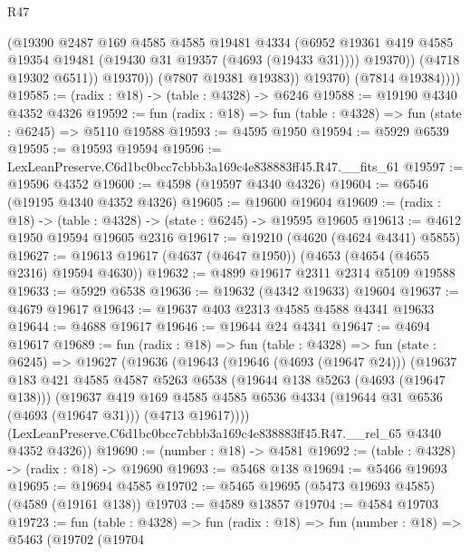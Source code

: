 \begin{lexlean}{R47}
\begin{coremodule}
                      (@19390
                        @2487
                        @169
                        @4585
                        @4585
                        @19481
                        @4334
                        (@6952
                          @19361
                          @419
                          @4585
                          @19354
                          @19481
                          (@19430 @31 @19357 (@4693 (@19433 @31))))
                        @19370))
                    (@4718 @19302 @6511))
                  @19370))
              (@7807 @19381 @19383))
            @19370)
          (@7814 @19384))))
@19585 := (radix : @18) -> (table : @4328) -> @6246
@19588 := @19190 @4340 @4352 @4326
@19592 := fun (radix : @18) => fun (table : @4328) => fun (state : @6245) => @5110 @19588
@19593 := @4595 @1950
@19594 := @5929 @6539
@19595 := @19593 @19594
@19596 := LexLeanPreserve.C6d1bc0bcc7cbbb3a169c4e838883ff45.R47.__fits_61
@19597 := @19596 @4352
@19600 := @4598 (@19597 @4340 @4326)
@19604 := @6546 (@19195 @4340 @4352 @4326)
@19605 := @19600 @19604
@19609 := (radix : @18) -> (table : @4328) -> (state : @6245) -> @19595 @19605
@19613 := @4612 @1950 @19594 @19605 @2316
@19617 := @19210 (@4620 (@4624 @4341) @5855)
@19627 := @19613 @19617 (@4637 (@4647 @1950)) (@4653 (@4654 (@4655 @2316) @19594 @4630))
@19632 := @4899 @19617 @2311 @2314 @5109 @19588
@19633 := @5929 @6538
@19636 := @19632 (@4342 @19633) @19604
@19637 := @4679 @19617
@19643 := @19637 @403 @2313 @4585 @4588 @4341 @19633
@19644 := @4688 @19617
@19646 := @19644 @24 @4341
@19647 := @4694 @19617
@19689 := fun (radix : @18) =>
  fun (table : @4328) =>
  fun (state : @6245) =>
  @19627
    (@19636
      (@19643
        (@19646 (@4693 (@19647 @24)))
        (@19637
          @183
          @421
          @4585
          @4587
          @5263
          @6538
          (@19644 @138 @5263 (@4693 (@19647 @138)))
          (@19637
            @419
            @169
            @4585
            @4585
            @6536
            @4334
            (@19644 @31 @6536 (@4693 (@19647 @31)))
            (@4713 @19617))))
      (LexLeanPreserve.C6d1bc0bcc7cbbb3a169c4e838883ff45.R47.__rel_65 @4340 @4352 @4326))
@19690 := (number : @18) -> @4581
@19692 := (table : @4328) -> (radix : @18) -> @19690
@19693 := @5468 @138
@19694 := @5466 @19693
@19695 := @19694 @4585
@19702 := @5465 @19695 (@5473 @19693 @4585) (@4589 (@19161 @138))
@19703 := @4589 @13857
@19704 := @4584 @19703
@19723 := fun (table : @4328) =>
  fun (radix : @18) =>
  fun (number : @18) =>
  @5463
    (@19702
      (@19704

\end{coremodule}
\end{lexlean}
